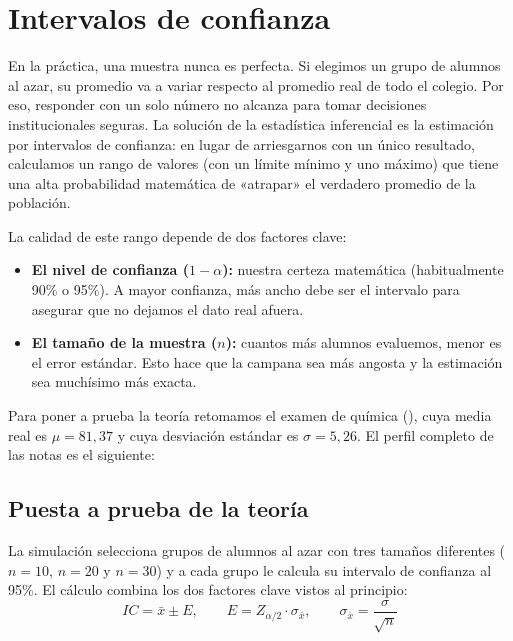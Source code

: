 \section{Intervalos de confianza}
En la práctica, una muestra nunca es perfecta. Si elegimos un grupo de alumnos al azar, su
promedio va a variar respecto al promedio real de todo el colegio. Por eso, responder con un
solo número no alcanza para tomar decisiones institucionales seguras. La solución de la
estadística inferencial es la estimación por intervalos de confianza: en lugar de arriesgarnos
con un único resultado, calculamos un rango de valores (con un límite mínimo y uno máximo) que
tiene una alta probabilidad matemática de «atrapar» el verdadero promedio de la población.

La calidad de este rango depende de dos factores clave:
\begin{itemize}
  \item \textbf{El nivel de confianza ($1 - \alpha$):} nuestra certeza matemática (habitualmente
    90\% o 95\%). A mayor confianza, más ancho debe ser el intervalo para asegurar que no    dejamos el dato real afuera.
  \item \textbf{El tamaño de la muestra ($n$):} cuantos más alumnos evaluemos, menor es el    error estándar. Esto hace que la campana sea más angosta y la estimación sea muchísimo más
    exacta.
\end{itemize}

\AnalisisDescriptivo
Para poner a prueba la teoría retomamos el examen de química (),
cuya media real es $\mu = 81{,}37$ y cuya desviación estándar es $\sigma = 5{,}26$. El perfil
completo de las notas es el siguiente:



\subsection{Puesta a prueba de la teoría}
La simulación selecciona grupos de alumnos al azar con tres tamaños diferentes ($n = 10$,
$n = 20$ y $n = 30$) y a cada grupo le calcula su intervalo de confianza al 95\%. El cálculo
combina los dos factores clave vistos al principio:
\begin{equation*}
  IC = \bar{x} \pm E, \qquad
  E = Z_{\alpha/2} \cdot \sigma_{\bar{x}}, \qquad
  \sigma_{\bar{x}} = \frac{\sigma}{\sqrt{n}}
\end{equation*}

